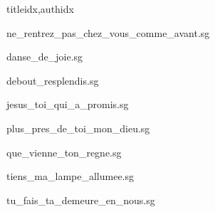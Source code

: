 \documentclass[
    ]{article}
\begin{document}
\begin{songs}{titleidx,authidx}

{ne_rentrez_pas_chez_vous_comme_avant.sg}


{danse_de_joie.sg}


{debout_resplendis.sg}


{jesus_toi_qui_a_promis.sg}


{plus_pres_de_toi_mon_dieu.sg}


{que_vienne_ton_regne.sg}


{tiens_ma_lampe_allumee.sg}


{tu_fais_ta_demeure_en_nous.sg}



\end{songs}
\end{document}

